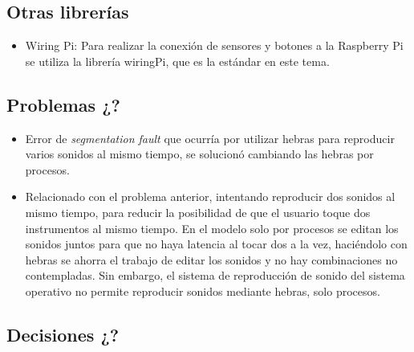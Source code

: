 \documentclass{article}
\begin{document}
 \subsection{Otras librerías}
 \begin{itemize}
     \item
        Wiring Pi\cite{wiringPi}: Para realizar la conexión de sensores y botones a la Raspberry Pi se utiliza
        la librería wiringPi, que es la estándar en este tema.
 \end{itemize}

 \subsection{Problemas ¿?}
 \begin{itemize}
     \item
        Error de \textit{segmentation fault} que ocurría por utilizar hebras para reproducir
        varios sonidos al mismo tiempo, se solucionó cambiando las hebras por procesos.
     \item
        Relacionado con el problema anterior, intentando reproducir dos sonidos al mismo tiempo, para reducir
        la posibilidad de que el usuario toque dos instrumentos al mismo tiempo. En el modelo solo por procesos
        se editan los sonidos juntos para que no haya latencia al tocar dos a la vez, haciéndolo con hebras se
        ahorra el trabajo de editar los sonidos y no hay combinaciones no contempladas. Sin embargo, el sistema
        de reproducción de sonido del sistema operativo no permite reproducir sonidos mediante hebras, solo
        procesos.
 \end{itemize}

 \subsection{Decisiones ¿?}
\end{document}

